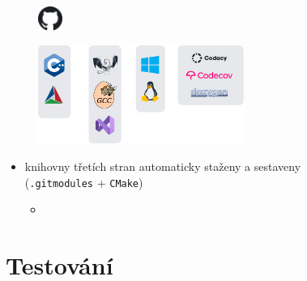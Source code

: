 \documentclass[compress]{beamer}
\begin{document}
\begin{frame}
	\vspace{-0.5cm}
	\begin{figure}
		\centering
		\includegraphics[width=0.07\textwidth]{img/logos/github.pdf}
	\end{figure}
	\centering
	\vspace{-0.4cm}
	\href{https://github.com/silhavyj/ZeroMate}{}
	\vspace{-0.1cm}
	\noindent\makebox[\linewidth]{\rule{\textwidth}{0.4pt}}
	\begin{figure}
		\centering
		\includegraphics[width=0.6\textwidth]{img/logos/logos.pdf}
	\end{figure}
	\vspace{-0.6cm}
	\noindent\makebox[\linewidth]{\rule{\textwidth}{0.4pt}}
	\vspace{-0.3cm}
	\begin{itemize}
		\item knihovny třetích stran automaticky staženy a sestaveny \\ (\texttt{.gitmodules} + \texttt{CMake})
		\begin{itemize}
			\item \href{https://github.com/google/googletest}{} \href{https://github.com/ocornut/imgui}{}
			\href{https://github.com/martin-olivier/dylib}{} 
			\href{https://github.com/serge1/ELFIO}{} 
			\href{https://github.com/glfw/glfw}{} 
			\href{https://github.com/capstone-engine/capstone}{}
		\end{itemize}
	\end{itemize}
\end{frame}

\section{Testování}
\end{document}
